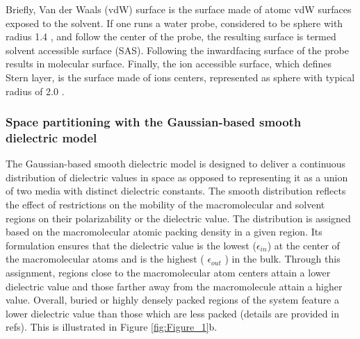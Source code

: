 \documentclass[9pt,tutorial,pubversion]{livecoms}
\begin{document}
Briefly, Van der Waals (vdW) surface is the surface made of atomc vdW surfaces exposed to the solvent. If one runs a water probe, considered to be sphere with radius 1.4 \text{\AA}, and follow the center of the probe, the resulting surface is termed solvent accessible surface (SAS). Following the inward\textendash facing surface of the probe results in molecular surface. Finally, the ion accessible surface, which defines Stern layer, is the surface made of ions centers, represented as sphere with typical radius of 2.0 \text{\AA}.

\subsubsection{Space partitioning with the Gaussian-based smooth dielectric model}
The Gaussian-based smooth dielectric model is designed to deliver a continuous distribution of dielectric values in space as opposed to representing it as a union of two media with distinct dielectric constants. 
The smooth distribution reflects the effect of restrictions on the mobility of the macromolecular and solvent regions on their polarizability or the dielectric value. The distribution is assigned based on the macromolecular atomic packing density in a given region. Its formulation ensures that the dielectric value is the lowest ($ \epsilon_{in} $) at the center of the macromolecular atoms and is the highest ( $ \epsilon_{out} $ ) in the bulk. Through this assignment, regions close to the macromolecular atom centers attain a lower dielectric value and those farther away from the macromolecule attain a higher value. Overall, buried or highly densely packed regions of the system feature a lower dielectric value than those which are less packed (details are provided in refs\cite{chakravorty2019grid,decherchi2013between}). This is illustrated in Figure \ref{fig:Figure_1}b.
\end{document}
